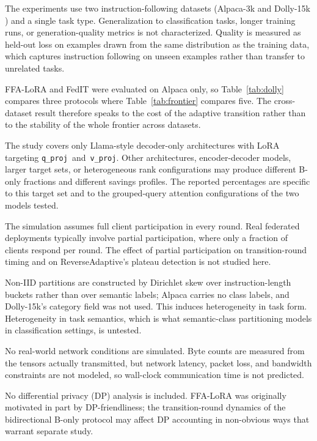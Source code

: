 The experiments use two instruction-following datasets (Alpaca-3k \cite{taori2023alpaca} and Dolly-15k \cite{dolly2023}) and a single task type. Generalization to classification tasks, longer training runs, or generation-quality metrics is not characterized. Quality is measured as held-out loss on examples drawn from the same distribution as the training data, which captures instruction following on unseen examples rather than transfer to unrelated tasks.

FFA-LoRA and FedIT were evaluated on Alpaca only, so Table~\ref{tab:dolly} compares three protocols where Table~\ref{tab:frontier} compares five. The cross-dataset result therefore speaks to the cost of the adaptive transition rather than to the stability of the whole frontier across datasets.

The study covers only Llama-style decoder-only architectures with LoRA targeting \mbox{\texttt{q\_proj} and \texttt{v\_proj}}. Other architectures, encoder-decoder models, larger target sets, or heterogeneous rank configurations may produce different B-only fractions and different savings profiles. The reported percentages are specific to this target set and to the grouped-query attention configurations of the two models tested.

The simulation assumes full client participation in every round. Real federated deployments typically involve partial participation, where only a fraction of clients respond per round. The effect of partial participation on transition-round timing and on ReverseAdaptive's plateau detection is not studied here.

Non-IID partitions are constructed by Dirichlet skew over instruction-length buckets rather than over semantic labels; Alpaca carries no class labels, and Dolly-15k's category field was not used. This induces heterogeneity in task form. Heterogeneity in task semantics, which is what semantic-class partitioning models in classification settings, is untested.

No real-world network conditions are simulated. Byte counts are measured from the tensors actually transmitted, but network latency, packet loss, and bandwidth constraints are not modeled, so wall-clock communication time is not predicted.

No differential privacy (DP) analysis is included. FFA-LoRA \cite{sun2024ffalora} was originally motivated in part by DP-friendliness; the transition-round dynamics of the bidirectional B-only protocol may affect DP accounting in non-obvious ways that warrant separate study.

